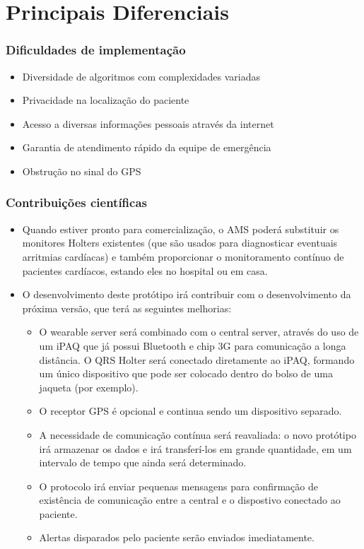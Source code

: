 \documentclass{beamer}
\begin{document}
\section{Principais Diferenciais}

\begin{frame}
\frametitle{Dificuldades de implementação}

	\begin{itemize}
		\item Diversidade de algoritmos com complexidades variadas
		\item Privacidade na localização do paciente
		\item Acesso a diversas informações pessoais através da internet
		\item Garantia de atendimento rápido da equipe de emergência
		\item Obstrução no sinal do GPS
	\end{itemize}
\end{frame}


\begin{frame}
\frametitle{Contribuições científicas}

	\begin{itemize}
		\item Quando estiver pronto para comercialização, o AMS poderá substituir os monitores Holters existentes (que são usados para diagnosticar eventuais arritmias cardíacas) e também proporcionar o monitoramento contínuo de pacientes cardíacos, estando eles no hospital ou em casa.
		\item O desenvolvimento deste protótipo irá contribuir com o desenvolvimento da próxima versão, que terá as seguintes melhorias:
		\begin{itemize}
			\item O wearable server será combinado com o central server, através do uso de um iPAQ que já possui Bluetooth e chip 3G para comunicação a longa distância. O QRS Holter será conectado diretamente ao iPAQ, formando um único dispositivo que pode ser colocado dentro do bolso de uma jaqueta (por exemplo).
			\item O receptor GPS é opcional e continua sendo um dispositivo separado.
			\item A necessidade de comunicação contínua será reavaliada: o novo protótipo irá armazenar os dados e irá transferí-los em grande quantidade, em um intervalo de tempo que ainda será determinado.
			\item O protocolo irá enviar pequenas mensagens para confirmação de existência de comunicação entre a central e o dispostivo conectado ao paciente. 
			\item Alertas disparados pelo paciente serão enviados imediatamente.
		\end{itemize}
	\end{itemize}
\end{frame}
\end{document}
